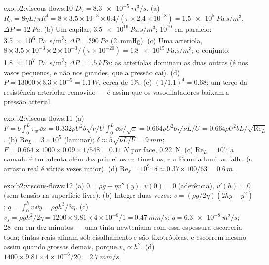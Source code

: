 \begin{solution}{exo:b2:viscous-flows:10}
$D_V = \qty{8.3e-5}{m^3/s}$. (a) $R_h = 8\eta L/\pi R^4 = 8 \times 3.5 \times 10^{-3} \times
0.4/(\pi \times 2.4 \times 10^{-8}) = \qty{1.5e5}{Pa.s/m^3}$, $\Delta P = \qty{12}{Pa}$. (b)
Um capilar, $\qty{3.5e16}{Pa.s/m^3}$; $10^{10}$ em paralelo: \qty{3.5e6}{Pa.s/m^3};
$\Delta P = \qty{290}{Pa}$ (\qty{2}{mmHg}). (c) Uma arteríola, $8 \times 3.5 \times 10^{-3}
\times 2 \times 10^{-3}/(\pi \times 10^{-20}) = \qty{1.8e15}{Pa.s/m^3}$; o conjunto:
\qty{1.8e7}{Pa.s/m^3}; $\Delta P = \qty{1.5}{kPa}$: as arteríolas dominam as
duas outras (é nos vasos pequenos, e não nos grandes, que a pressão
cai). (d) $P = 13000 \times 8.3 \times 10^{-5} = \qty{1.1}{W}$, cerca de $1\%$. (e)
$(1/1.1)^4 = 0.68$: um terço da resistência arteriolar removido ---
é assim que os vasodilatadores baixam a pressão arterial.
\end{solution}

\begin{solution}{exo:b2:viscous-flows:11}
(a) $F = b\int_0^L\tau_w\,\dd x = 0.332\rho U^2b\sqrt{\nu/U}\int_0^L\dd x/\sqrt x =
0.664\rho U^2b\sqrt{\nu L/U} = 0.664\rho U^2bL/\sqrt{\mathrm{Re}_L}$. (b) $\mathrm{Re}_L =
3 \times 10^5$ (laminar); $\delta \approx 5\sqrt{\nu L/U} = \qty{9}{mm}$; $F = 0.664 \times 1000
\times 0.09 \times 1/548 = \qty{0.11}{N}$ por face, \qty{0.22}{N}. (c) $\mathrm{Re}_L = 10^7$:
a camada é turbulenta além dos primeiros centímetros, e a fórmula
laminar falha (o arrasto real é várias vezes maior). (d) $\mathrm{Re}_x =
10^9$: $\delta \approx 0.37 \times 100/63 = \qty{0.6}{m}$.
\end{solution}

\begin{solution}{exo:b2:viscous-flows:12}
(a) $0 = \rho g + \eta v''(y)$, $v(0) = 0$ (aderência), $v'(h) = 0$ (sem tensão na
superfície livre). (b) Integre duas vezes: $v = (\rho g/2\eta)(2hy - y^2)$; $q =
\int_0^hv\,\dd y = \rho gh^3/3\eta$. (c) $v_s = \rho gh^2/2\eta = 1200 \times 9.81 \times
4 \times 10^{-8}/1 = \qty{0.47}{mm/s}$; $q = \qty{6.3e-8}{m^2/s}$; \qty{28}{cm} em dez
minutos --- uma tinta newtoniana com essa espessura escorreria toda; tintas
reais afinam sob cisalhamento e são tixotrópicas, e escorrem mesmo assim quando grossas demais,
porque $v_s \propto h^2$. (d) $1400 \times 9.81 \times 4 \times 10^{-6}/20 = \qty{2.7}{mm/s}$.
\end{solution}

